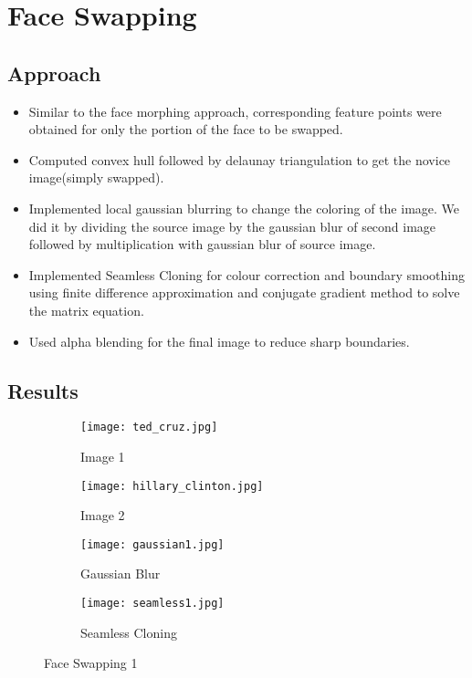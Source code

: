 \documentclass{article}
\begin{document}
\clearpage

\section{Face Swapping}
\subsection{Approach}
\begin{itemize}
    \item Similar to the face morphing approach, corresponding feature points were obtained for only the portion of the face to be swapped.
    \item Computed convex hull followed by delaunay triangulation to get the novice image(simply swapped).
    \item Implemented local gaussian blurring to change the coloring of the image. We did it by dividing the source image by the gaussian blur of second image followed by multiplication with gaussian blur of source image.
    \item Implemented Seamless Cloning for colour correction and boundary smoothing using finite difference approximation and conjugate gradient method to solve the matrix equation.
    \item Used alpha blending for the final image to reduce sharp boundaries.
\end{itemize}

\subsection{Results}

\begin{figure}[!ht]
\begin{subfigure}{.24\textwidth}
\centering
\texttt{[image: ted\_cruz.jpg]}
\caption{Image 1}
\end{subfigure}
\begin{subfigure}{.24\textwidth}
\centering
\texttt{[image: hillary\_clinton.jpg]}
\caption{Image 2}
\end{subfigure}
\begin{subfigure}{.24\textwidth}
\centering
\texttt{[image: gaussian1.jpg]}
\caption{Gaussian Blur}
\end{subfigure}
\begin{subfigure}{.24\textwidth}
\centering
\texttt{[image: seamless1.jpg]}
\caption{Seamless Cloning}
\end{subfigure}
\caption{Face Swapping 1}
\end{figure}
\end{document}
